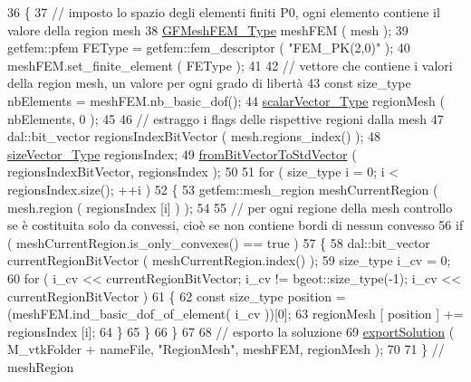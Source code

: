 \begin{DoxyCode}
36 \{
37         \textcolor{comment}{// imposto lo spazio degli elementi finiti P0, ogni elemento contiene il valore della region mesh }
38         \hyperlink{Core_8h_ae7bbd1c30a789b1da88f5459e0b70ab5}{GFMeshFEM\_Type} meshFEM ( mesh );
39         getfem::pfem FEType = getfem::fem\_descriptor ( \textcolor{stringliteral}{"FEM\_PK(2,0)"} );
40         meshFEM.set\_finite\_element ( FEType );
41 
42         \textcolor{comment}{// vettore che contiene i valori della region mesh, un valore per ogni grado di libertà}
43         \textcolor{keyword}{const} size\_type nbElements = meshFEM.nb\_basic\_dof();
44         \hyperlink{Core_8h_a4e75b5863535ba1dd79942de2846eff0}{scalarVector\_Type} regionMesh ( nbElements, 0 );
45 
46         \textcolor{comment}{// estraggo i flags delle rispettive regioni dalla mesh}
47         dal::bit\_vector regionsIndexBitVector ( mesh.regions\_index() );
48         \hyperlink{Core_8h_a83c51913d041a5001e8683434c09857f}{sizeVector\_Type} regionsIndex;
49         \hyperlink{UsefulFunctions_8h_a0ea0b08a12a1e6a94718cf3bcd60edeb}{fromBitVectorToStdVector} ( regionsIndexBitVector, regionsIndex );
50 
51         \textcolor{keywordflow}{for} ( size\_type i = 0; i < regionsIndex.size(); ++i )
52         \{
53                 getfem::mesh\_region meshCurrentRegion ( mesh.region ( regionsIndex [i] ) );
54                 
55                 \textcolor{comment}{// per ogni regione della mesh controllo se è costituita solo da convessi, cioè se non
       contiene bordi di nessun convesso}
56                 \textcolor{keywordflow}{if} ( meshCurrentRegion.is\_only\_convexes() == true )
57                 \{
58                         dal::bit\_vector currentRegionBitVector ( meshCurrentRegion.index() );
59                         size\_type i\_cv = 0;
60                         \textcolor{keywordflow}{for} ( i\_cv << currentRegionBitVector; i\_cv != bgeot::size\_type(-1); i\_cv << 
      currentRegionBitVector )
61                         \{
62                                 \textcolor{keyword}{const} size\_type position = (meshFEM.ind\_basic\_dof\_of\_element( i\_cv ))[0];
63                                 regionMesh [ position ] += regionsIndex [i];
64                         \}
65                 \}
66         \}
67 
68         \textcolor{comment}{// esporto la soluzione}
69         \hyperlink{UsefulFunctions_8h_add7b8b88dc68d93addd88b9a4dc6e8bf}{exportSolution} ( M\_vtkFolder + nameFile, \textcolor{stringliteral}{"RegionMesh"}, meshFEM, regionMesh );
70 
71 \} \textcolor{comment}{// meshRegion}
\end{DoxyCode}
